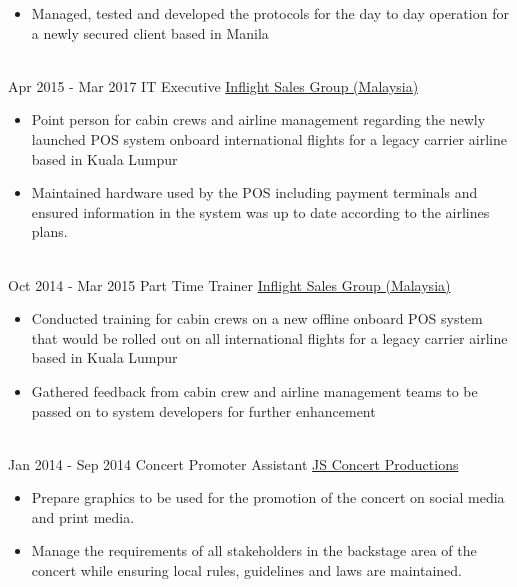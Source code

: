 \documentclass[letterpaper]{twentysecondcv} %
\begin{document}
\begin{twenty}
{{\begin{itemize}
        \item Managed, tested and developed the protocols for the day to day operation for a newly secured client based in Manila   
    \end{itemize}}
        }
    \\
    \twentyitem
   		{Apr 2015 -}
		{Mar 2017}
        {IT Executive}
        {\href{}{Inflight Sales Group (Malaysia)}}
        {}
        {
        {\begin{itemize}
        \item Point person for cabin crews and airline management regarding the newly launched POS system onboard international flights for a legacy carrier airline based in Kuala Lumpur
        \item Maintained hardware used by the POS including payment terminals and ensured information in the system was up to date according to the airlines plans.
    \end{itemize}}
        }
     \\   
    \twentyitem
   		{Oct 2014 -}
		{Mar 2015}
        {Part Time Trainer}
        {\href{}{Inflight Sales Group (Malaysia)}}
        {}
        {
        {\begin{itemize}
        \item Conducted training for cabin crews on a new offline onboard POS system that would be rolled out on all international flights for a legacy carrier airline based in Kuala Lumpur
        \item Gathered feedback from cabin crew and airline management teams to be passed on to system developers for further enhancement
    \end{itemize}}
        }
     \\
     \twentyitem
   		{Jan 2014 -}
		{Sep 2014}
        {Concert Promoter Assistant}
        {\href{https://www.jsconcert.com/}{JS Concert Productions}}
        {}
        {
        \begin{itemize}
        \item Prepare graphics to be used for the promotion of the concert on social media and print media.
        \item Manage the requirements of all stakeholders in the backstage area of the concert while ensuring local rules, guidelines and laws are maintained.
    \end{itemize}
    	}
        
\end{twenty}
\end{document}

